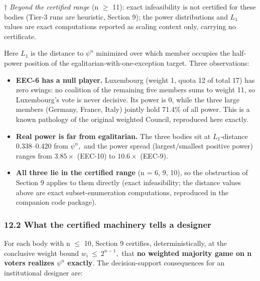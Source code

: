 \documentclass[
]{article}
\providecommand{\tightlist}{%
  \setlength{\itemsep}{0pt}\setlength{\parskip}{0pt}}
\begin{document}
† \emph{Beyond the certified range} (n \(\ge\) 11): exact infeasibility
is not certified for these bodies (Tier-3 runs are heuristic, Section
9); the power distributions and \(L_1\) values are exact computations
reported as scaling context only, carrying no certificate.

Here \(L_1\) is the distance to \(\psi^n\) minimized over which member
occupies the half-power position of the egalitarian-with-one-exception
target. Three observations:

\begin{itemize}
\tightlist
\item
  \textbf{EEC-6 has a null player.} Luxembourg (weight 1, quota 12 of
  total 17) has zero swings: no coalition of the remaining five members
  sums to weight 11, so Luxembourg's vote is never decisive. Its power
  is 0, while the three large members (Germany, France, Italy) jointly
  hold 71.4\% of all power. This is a known pathology of the original
  weighted Council, reproduced here exactly.
\item
  \textbf{Real power is far from egalitarian.} The three bodies sit at
  \(L_1\)-distance 0.338--0.420 from \(\psi^n,\) and the power spread
  (largest/smallest positive power) ranges from \(3.85\times\) (EEC-10)
  to \(10.6\times\) (EEC-9).
\item
  \textbf{All three lie in the certified range} (n = 6, 9, 10), so the
  obstruction of Section 9 applies to them directly (exact
  infeasibility; the distance values above are exact subset-enumeration
  computations, reproduced in the companion code package).
\end{itemize}

\subsubsection{12.2 What the certified machinery tells a
designer}\label{what-the-certified-machinery-tells-a-designer}

For each body with n \(\le\) 10, Section 9 certifies, deterministically,
at the conclusive weight bound \(w_i\ \le\ 2^{n-1},\) that \textbf{no
weighted majority game on n voters realizes \(\psi^n\) exactly}. The
decision-support consequences for an institutional designer are:
\end{document}
